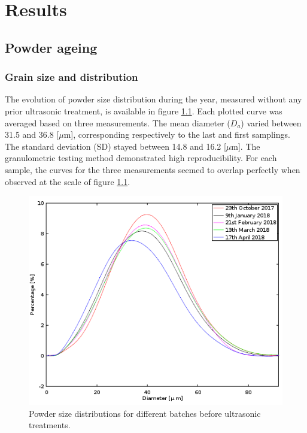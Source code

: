 \chapter{Results}
\label{Chap4}
\section{Powder ageing}

\subsection{Grain size and distribution}

The evolution of powder size distribution during the year, measured without any prior ultrasonic treatment, is available in figure \ref{fig:granulo}. Each plotted curve was averaged based on three measurements. The mean diameter ($D_a$) varied between 31.5 and 36.8 [$\mu$m], corresponding respectively to the last and first samplings. The standard deviation (SD) stayed between 14.8 and 16.2 [$\mu$m]. The granulometric testing method demonstrated high reproducibility. For each sample, the curves for the three measurements seemed to overlap perfectly when observed at the scale of figure \ref{fig:granulo}.\\%

\begin{figure}[ht]
	\centering
	\includegraphics[scale=1]{Images/Granulo}
	\decoRule
	\caption[Powder size distributions for different batches before ultrasonic treatments.]{Powder size distributions for different batches before ultrasonic treatments.}
	\label{fig:granulo}
\end{figure}

